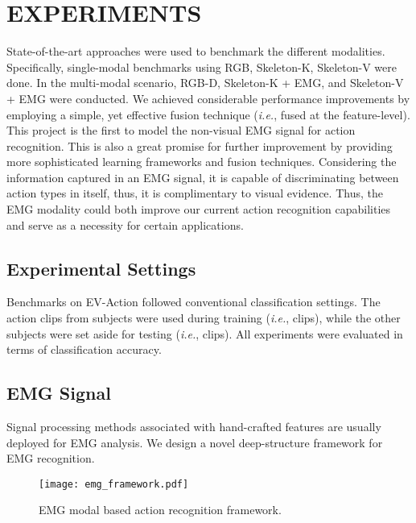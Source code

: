 \documentclass[a4paper, 10pt, conference]{ieeeconf}      \usepackage{FG2020}
\newcommand*\ie{\textit{i.e.}}
\begin{document}
\section{EXPERIMENTS}
State-of-the-art approaches were used to benchmark the different modalities. Specifically, single-modal benchmarks using RGB, Skeleton-K, Skeleton-V were done. In the multi-modal scenario, RGB-D, Skeleton-K + EMG, and Skeleton-V + EMG were conducted. We achieved considerable performance improvements by employing a simple, yet effective fusion technique (\ie, fused at the feature-level). This project is the first to model the non-visual EMG signal for action recognition. This is also a great promise for further improvement by providing more sophisticated learning frameworks and fusion techniques. Considering the information captured in an EMG signal, it is capable of discriminating between action types in itself, thus, it is complimentary to visual evidence. Thus, the EMG modality could both improve our current action recognition capabilities and serve as a necessity for certain applications.

\subsection{Experimental Settings}
Benchmarks on EV-Action followed conventional classification settings. The action clips from  subjects were used during training (\ie,  clips), while the other  subjects were set aside for testing (\ie,  clips). All experiments were evaluated in terms of classification accuracy.

\subsection{EMG Signal}
Signal processing methods associated with hand-crafted features are usually deployed for EMG analysis. We design a novel deep-structure framework for EMG recognition.

\begin{figure}[!tp]
\centering
\texttt{[image: emg\_framework.pdf]}
\vspace{-1mm}
\caption{EMG modal based action recognition framework.}\label{fig:emg_framework}
\vspace{-2mm}
\end{figure}
\end{document}
